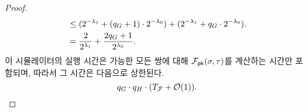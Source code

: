 \begin{proof}
\begin{align*}
		&\le (2^{-\lambda_1} + (q_{G} + 1) \cdot 2^{-\lambda_0}) + (2^{-\lambda_1} + q_{G} \cdot 2^{-\lambda_0}). \\
		&= \frac{2}{2^{\lambda_1}} + \frac{2q_{G} + 1}{2^{\lambda_0}}.
	\end{align*}
	이 시뮬레이터의 실행 시간은 가능한 모든 쌍에 대해 $\mathcal{F}_{\textsf{pk}}(\sigma, \tau)$를 계산하는 시간만 포함되며, 따라서 그 시간은 다음으로 상한된다.
	$$q_G \cdot q_H \cdot (T_{\mathcal{F}} + \mathcal{O}(1)).$$

\end{proof}


